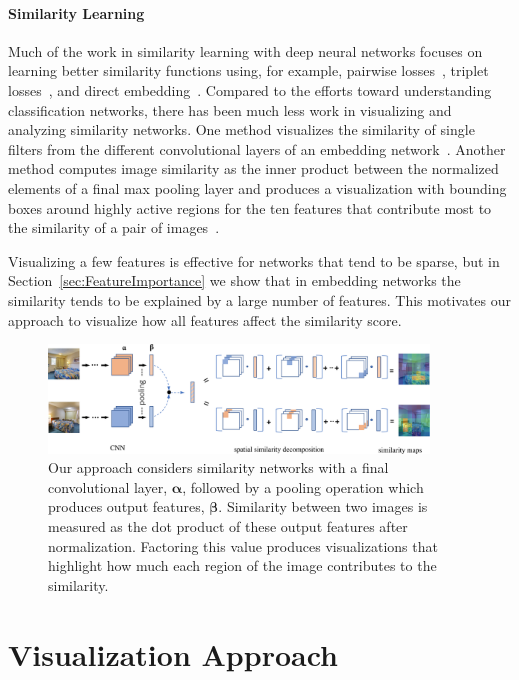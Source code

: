 \paragraph{Similarity Learning}
Much of the work in similarity learning with deep neural networks focuses on learning better similarity functions using, for example, pairwise losses~\cite{sun2014deep,wang2014learning,yi2014deep}, triplet losses~\cite{HermansBeyer2017Arxiv,schroff2015facenet,song2016deep,ustinova2016learning}, and direct embedding~\cite{Proxy}. Compared to the efforts toward understanding classification networks, there has been much less work in visualizing and analyzing similarity networks. One method visualizes the similarity of single filters from the different convolutional layers of an embedding network~\cite{Ahmed_2015_CVPR}. Another method computes image similarity as the inner product between the normalized elements of a final max pooling layer and produces a visualization with bounding boxes around highly active regions for the ten features that contribute most to the similarity of a pair of images~\cite{RTC16,tolias2016rmac}. 

Visualizing a few features is effective for networks that tend to be sparse, but in Section~\ref{sec:FeatureImportance} we show that in embedding networks the similarity tends to be explained by a large number of features.  This motivates our approach to visualize how all features affect the similarity score.

\begin{figure}
    \centering
    \includegraphics[width=0.9\textwidth]{figures/chapter7/process.png}
    \caption{Our approach considers similarity networks with a final convolutional layer, $\boldsymbol{\alpha}$, followed by a pooling operation which produces output features, $\boldsymbol{\beta}$. Similarity between two images is measured as the dot product of these output features after normalization.  Factoring this value produces visualizations that highlight how much each region of the image contributes to the similarity.}
    \label{fig:visApproach}
\end{figure}
\section{Visualization Approach}
\label{sec:model}

